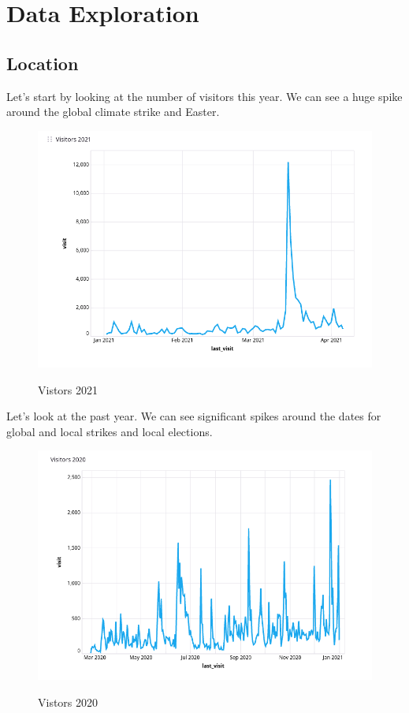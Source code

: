 %
%

\pagebreak
\section{Data Exploration}

\onehalfspacing

\subsection{Location}

Let's start by looking at the number of visitors this year. We can see a huge spike around the global climate strike and Easter.

\begin{figure}[H]
\centering
\caption {Vistors 2021}
\includegraphics[width=\linewidth]{images/figure01.png}
\label{fig:visitors2021}
\end{figure}

Let's look at the past year. We can see significant spikes around the dates for global and local strikes and local elections.

\begin{figure}[H]
\centering
\caption {Vistors 2020}
\includegraphics[width=\linewidth]{images/figure02.png}
\label{fig:vistors2020}
\end{figure}

